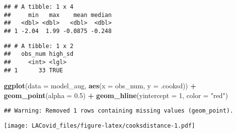 \documentclass[
]{article}
\newenvironment{Shaded}{\begin{snugshade}}{\end{snugshade}}
\newcommand{\DataTypeTok}[1]{\textcolor[rgb]{0.13,0.29,0.53}{#1}}
\newcommand{\DecValTok}[1]{\textcolor[rgb]{0.00,0.00,0.81}{#1}}
\newcommand{\FloatTok}[1]{\textcolor[rgb]{0.00,0.00,0.81}{#1}}
\newcommand{\KeywordTok}[1]{\textcolor[rgb]{0.13,0.29,0.53}{\textbf{#1}}}
\newcommand{\NormalTok}[1]{#1}
\newcommand{\OperatorTok}[1]{\textcolor[rgb]{0.81,0.36,0.00}{\textbf{#1}}}
\newcommand{\OtherTok}[1]{\textcolor[rgb]{0.56,0.35,0.01}{#1}}
\newcommand{\StringTok}[1]{\textcolor[rgb]{0.31,0.60,0.02}{#1}}
\begin{document}
\begin{verbatim}
## # A tibble: 1 x 4
##     min   max    mean median
##   <dbl> <dbl>   <dbl>  <dbl>
## 1 -2.04  1.99 -0.0875 -0.248
\end{verbatim}

\begin{Shaded}
\end{Shaded}

\begin{verbatim}
## # A tibble: 1 x 2
##   obs_num high_sd
##     <int> <lgl>  
## 1      33 TRUE
\end{verbatim}

\begin{Shaded}
\begin{Highlighting}[]
\KeywordTok{ggplot}\NormalTok{(}\DataTypeTok{data =}\NormalTok{ model_aug, }\KeywordTok{aes}\NormalTok{(}\DataTypeTok{x =}\NormalTok{ obs_num, }\DataTypeTok{y =}\NormalTok{ .cooksd)) }\OperatorTok{+}\StringTok{ }
\StringTok{  }\KeywordTok{geom_point}\NormalTok{(}\DataTypeTok{alpha =} \FloatTok{0.5}\NormalTok{) }\OperatorTok{+}
\StringTok{  }\KeywordTok{geom_hline}\NormalTok{(}\DataTypeTok{yintercept =} \DecValTok{1}\NormalTok{, }\DataTypeTok{color =} \StringTok{"red"}\NormalTok{)}
\end{Highlighting}
\end{Shaded}

\begin{verbatim}
## Warning: Removed 1 rows containing missing values (geom_point).
\end{verbatim}

\texttt{[image: LACovid\_files/figure-latex/cooksdistance-1.pdf]}

\begin{Shaded}
\end{Shaded}
\end{document}
